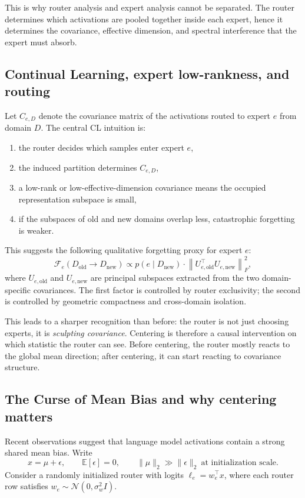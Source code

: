 \documentclass[11pt]{article}
\begin{document}
This is why router analysis and expert analysis cannot be separated. The router determines which activations are pooled together inside each expert, hence it determines the covariance, effective dimension, and spectral interference that the expert must absorb.

\subsection{Continual Learning, expert low-rankness, and routing}
Let $C_{e,D}$ denote the covariance matrix of the activations routed to expert $e$ from domain $D$. The central CL intuition is:
\begin{enumerate}
    \item the router decides which samples enter expert $e$,
    \item the induced partition determines $C_{e,D}$,
    \item a low-rank or low-effective-dimension covariance means the occupied representation subspace is small,
    \item if the subspaces of old and new domains overlap less, catastrophic forgetting is weaker.
\end{enumerate}
This suggests the following qualitative forgetting proxy for expert $e$:
\[
\mathcal{F}_e(D_{\mathrm{old}}\!\to\! D_{\mathrm{new}})
\propto
p(e\mid D_{\mathrm{new}})
\cdot
\left\|U_{e,\mathrm{old}}^\top U_{e,\mathrm{new}}\right\|_F^2,
\]
where $U_{e,\mathrm{old}}$ and $U_{e,\mathrm{new}}$ are principal subspaces extracted from the two domain-specific covariances. The first factor is controlled by router exclusivity; the second is controlled by geometric compactness and cross-domain isolation.

This leads to a sharper recognition than before: the router is not just choosing experts, it is \emph{sculpting covariance}. Centering is therefore a causal intervention on which statistic the router can see. Before centering, the router mostly reacts to the global mean direction; after centering, it can start reacting to covariance structure.

\subsection{The Curse of Mean Bias and why centering matters}
Recent observations suggest that language model activations contain a strong shared mean bias. Write
\[
x=\mu+\epsilon,\qquad \mathbb{E}[\epsilon]=0,\qquad \|\mu\|_2\gg \|\epsilon\|_2 \ \text{at initialization scale}.
\]
Consider a randomly initialized router with logits $\ell_e = w_e^\top x$, where each router row satisfies $w_e\sim \mathcal{N}(0,\sigma_w^2 I)$.
\end{document}
